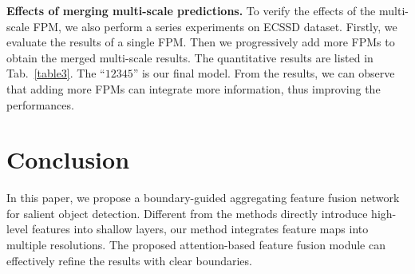 \documentclass[journal]{IEEEtran}
\newcommand{\ignore}[1]{}
\begin{document}
\textbf{Effects of merging multi-scale predictions.} To verify the effects of the multi-scale FPM, we also perform a series experiments on ECSSD dataset.
Firstly, we evaluate the results of a single FPM.
Then we progressively add more FPMs to obtain the merged multi-scale results.
The quantitative results are listed in Tab.~\ref{table3}.
The ``$12345$” is our final model. From the results, we can observe that adding more FPMs can integrate more information, thus improving the performances.
\begin{table}[thp]
\begin{center}
\caption{Quantitative results of merging multi-scale predictions.}
\label{table3}
\vspace{-6mm}
\end{center}
\end{table}
\section{Conclusion}
\label{sec:Conclusion}
In this paper, we propose a boundary-guided aggregating feature fusion network for salient object detection.
Different from the methods directly introduce high-level features into shallow layers, our method integrates feature maps into multiple resolutions.
The proposed attention-based feature fusion module can effectively refine the results with clear boundaries.




\ifCLASSOPTIONcaptionsoff
  \newpage
\fi










\ignore{
\begin{IEEEbiography}{}

\end{IEEEbiography}



\begin{IEEEbiographynophoto}{John Doe}

\end{IEEEbiographynophoto}


\begin{IEEEbiographynophoto}{Jane Doe}
Biography text here.
\end{IEEEbiographynophoto}

}
\end{document}
